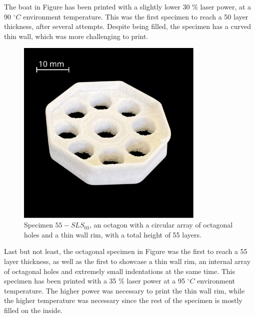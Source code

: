 \documentclass[a4paper]{article}
\begin{document}
        The boat in Figure  has been printed with a slightly lower 30 \% laser power, at a 90 $^{\circ}C$ 
        environment temperature. This was the first specimen to reach a 50 layer thickness, after several attempts. Despite being filled, 
        the specimen has a curved thin wall, which was more challenging to print. \\ 

        \begin{figure}[H]
            \centering
            \includegraphics[width=0.8\textwidth]{Pictures/Printed_parts/Fixed/Fixed_New/octagon_holes.pdf}
            \caption{Specimen $55-SLS_{03}$, an octagon with a circular array of octagonal holes and a thin wall rim, with a total height of 55 layers.}
            \label{fig:printed_specimens_octagonholes}
        \end{figure}

        Last but not least, the octagonal specimen in Figure  was the first to reach a 55 layer thickness, as well 
        as the first to showcase a thin wall rim, an internal array of octagonal holes and extremely small indentations at the same time. 
        This specimen has been printed with a 35 \% laser power at a 95 $^{\circ}C$ environment temperature. The higher power was 
        necessary to print the thin wall rim, while the higher temperature was necessary since the rest of the specimen is mostly filled on the inside. 
        

        \clearpage
\end{document}
